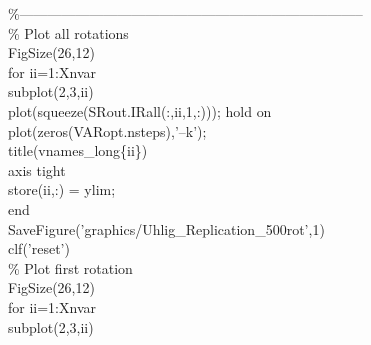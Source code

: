 \hspace{1mm}\textcolor{matlabgreen}{\%--------------------------------------------------------------------------  }\\ 
\hspace{1mm}\textcolor{matlabgreen}{\% Plot all rotations }\\ 
\hspace{1mm}FigSize(26,12) \\ 
\hspace{1mm}\textcolor{matlabblue}{for} ii=1:Xnvar \\ 
\hspace{1mm}\hspace{5mm} subplot(2,3,ii) \\ 
\hspace{1mm}\hspace{5mm} plot(squeeze(SRout.IRall(:,ii,1,:))); hold on \\ 
\hspace{1mm}\hspace{5mm} plot(zeros(VARopt.nsteps),\textcolor{matlabpurple}{'--k'}); \\ 
\hspace{1mm}\hspace{5mm} title(vnames\_long\{ii\}) \\ 
\hspace{1mm}\hspace{5mm} axis tight \\ 
\hspace{1mm}\hspace{5mm} 	store(ii,:) = ylim; \\ 
\hspace{1mm}\textcolor{matlabblue}{end} \\ 
\hspace{1mm}SaveFigure(\textcolor{matlabpurple}{'graphics/Uhlig\_Replication\_500rot'},1) \\ 
\hspace{1mm}clf(\textcolor{matlabpurple}{'reset'}) \\ 
\hspace{1mm}\textcolor{matlabgreen}{\% Plot first rotation }\\ 
\hspace{1mm}FigSize(26,12) \\ 
\hspace{1mm}\textcolor{matlabblue}{for} ii=1:Xnvar \\ 
\hspace{1mm}\hspace{5mm} subplot(2,3,ii) \\ 
